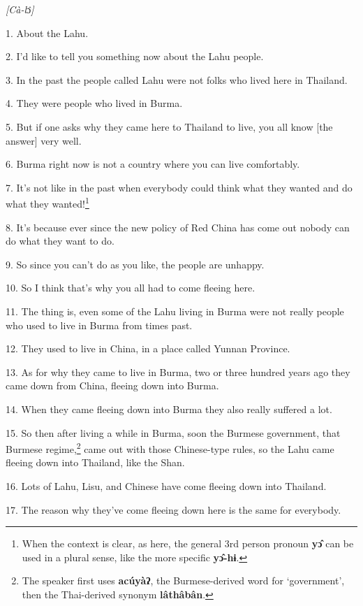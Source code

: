 \setcounter{footnote}{0}

\textit{[Cà-l}ɔ\textit{̂]}

1. About the Lahu.

2. I'd like to tell you something now about the Lahu people.

3. In the past the people called Lahu were not folks who lived here in Thailand.

4. They were people who lived in Burma.

5. But if one asks why they came here to Thailand to live, you all know [the answer]
very well.

6. Burma right now is not a country where you can live comfortably.

7. It's not like in the past when everybody could think what they wanted and do
what they wanted!\footnote{When the context is clear, as here, the general 3rd person pronoun \textbf{yɔ̂} can be used in a plural sense, like the more specific \textbf{yɔ̂-hɨ}.}

8. It's because ever since the new policy of Red China has come out nobody can
do what they want to do.

9. So since you can't do as you like, the people are unhappy.

10. So I think that's why you all had to come fleeing here.

11. The thing is, even some of the Lahu living in Burma were not really people who used to live in Burma from times past.

12. They used to live in China, in a place called Yunnan Province.

13. As for why they came to live in Burma, two or three hundred years ago they
came down from China, fleeing down into Burma.

14. When they came fleeing down into Burma they also really suffered a lot.

15. So then after living a while in Burma, soon the Burmese government, that Burmese
regime,\footnote{The speaker first uses \textbf{acúyàʔ}, the Burmese-derived word for `government', then the Thai-derived synonym \textbf{lâthâbân}.} came out with those Chinese-type rules, so the Lahu came fleeing down
into Thailand, like the Shan.

16. Lots of Lahu, Lisu, and Chinese have come fleeing down into Thailand.

17. The reason why they've come fleeing down here is the same for everybody.

